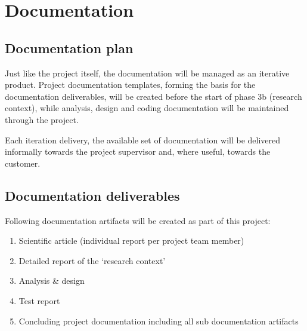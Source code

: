 
\section{Documentation}
\label{sec:documentation}
\subsection{Documentation plan}
Just like the project itself, the documentation will be managed as an iterative product.
Project documentation templates, forming the basis for the documentation deliverables, will be created before the start of phase 3b (research context), while analysis, design and coding documentation will be maintained through the project.

Each iteration delivery, the available set of documentation will be delivered informally towards the project supervisor and, where useful, towards the customer.

\subsection{Documentation deliverables}
Following documentation artifacts will be created  as part of this project:

	\begin{enumerate}
		\item Scientific article (individual report per project team member)
		\item Detailed report of the `research context'
		\item Analysis \& design
		\item Test report
		\item Concluding project documentation including all sub documentation artifacts
	\end{enumerate}

